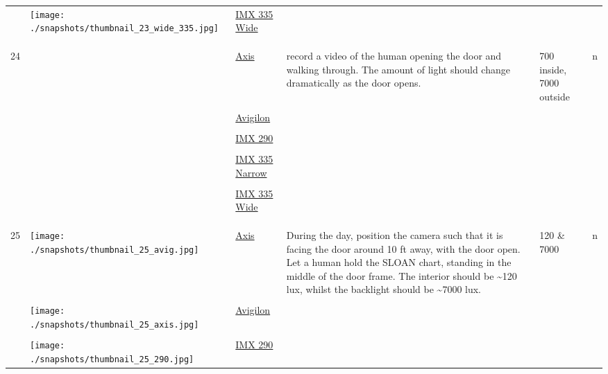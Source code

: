 \documentclass{article}%
\begin{document}
\begin{longtabu}{m{2.5cm} m{4cm} m{2cm} m{4cm} m{2cm} m{2cm}}
&\texttt{[image: ./snapshots/thumbnail\_23\_wide\_335.jpg]}&\href{https://drive.google.com/file/d/1j9z_oWvJehpu6zqozKz3_L6Y8Ei9iugT/view?usp=sharing}{IMX 335 Wide}&&&\\%
&&&&&\\%
&&&&&\\%
\hline%
&&&&&\\%
24&&\href{https://drive.google.com/file/d/1bv4_cJTwBhGiDCiwVVMU_Q9BXDPUxjZe/view?usp=sharing}{Axis}&record a video of the human opening the door and walking through. The amount of light should change dramatically as the door opens.&700 inside, 7000 outside&n\\%
&&&&&\\%
&&\href{https://drive.google.com/file/d/1E9mTZjE4hcH4p6iyjmVwLgU7ZJgHPDNo/view?usp=sharing}{Avigilon}&&&\\%
&&&&&\\%
&&\href{https://drive.google.com/file/d/1-WdobavcKGmV76Sw2VqABW7PGPYWItux/view?usp=sharing}{IMX 290}&&&\\%
&&&&&\\%
&&\href{https://drive.google.com/file/d/1xG0DIWKWEw2SWbxUsHeIKySJDZk1MdGz/view?usp=sharing}{IMX 335 Narrow}&&&\\%
&&&&&\\%
&&\href{https://drive.google.com/file/d/1u-Yh-sdaH-v5JO0Ea9CL8RnSdwdJQEmY/view?usp=sharing}{IMX 335 Wide}&&&\\%
&&&&&\\%
&&&&&\\%
\hline%
&&&&&\\%
25&\texttt{[image: ./snapshots/thumbnail\_25\_avig.jpg]}&\href{https://drive.google.com/file/d/1UXV1n18TmUBdrUF3zLQK1U2bcGgcaTGH/view?usp=sharing}{Axis}&During the day, position the camera such that it is facing the door around 10 ft away, with the door open. Let a human hold the SLOAN chart, standing in the middle of the door frame. The interior should be \textasciitilde{}120 lux, whilst the backlight should be \textasciitilde{}7000 lux.&120 \& 7000&n\\%
&&&&&\\%
&\texttt{[image: ./snapshots/thumbnail\_25\_axis.jpg]}&\href{https://drive.google.com/file/d/1o2viVG7-Epg9faqyeNiT3ywSaYwalyge/view?usp=sharing}{Avigilon}&&&\\%
&&&&&\\%
&\texttt{[image: ./snapshots/thumbnail\_25\_290.jpg]}&\href{https://drive.google.com/file/d/1wrufKkP7V2OENCQwg_tccEXJtivJ8b8F/view?usp=sharing}{IMX 290}&&&\\%

\end{longtabu}
\end{document}
